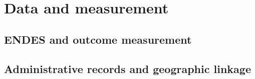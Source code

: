 \section{Data and measurement}
\subsection{ENDES and outcome measurement}
\subsection{Administrative records and geographic linkage}
